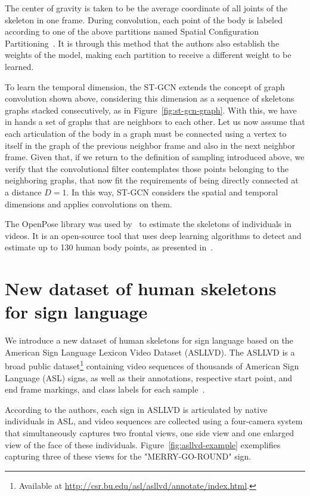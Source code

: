 The center of gravity is taken to be the average coordinate of all joints of the skeleton in one frame. During convolution, each point of the body is labeled according to one of the above partitions named Spatial Configuration Partitioning~\cite{st-gcn-2018}. It is through this method that the authors also establish the weights of the model, making each partition to receive a different weight to be learned.

To learn the temporal dimension, the ST-GCN extends the concept of graph convolution shown above, considering this dimension as a sequence of skeletons graphs stacked consecutively, as in Figure~\ref{fig:st-gcn-graph}. With this, we have in hands a set of graphs that are neighbors to each other. Let us now assume that each articulation of the body in a graph must be connected using a vertex to itself in the graph of the previous neighbor frame and also in the next neighbor frame. Given that, if we return to the definition of sampling introduced above, we verify that the convolutional filter contemplates those points belonging to the neighboring graphs, that now fit the requirements of being directly connected at a distance $D = 1$. In this way, ST-GCN considers the spatial and temporal dimensions and applies convolutions on them.

The OpenPose library was used by~\cite{st-gcn-2018} to estimate the skeletons of individuals in videos. It is an open-source tool that uses deep learning algorithms to detect and estimate up to 130 human body points, as presented in~\cite{cao-realtime-2017,simon-hand-2017,wei-cpm-2016}. 


\section{New dataset of human skeletons for sign language} 
\label{sec:new-dataset}

We introduce a new dataset of human skeletons for sign language based on the American Sign Language Lexicon Video Dataset (ASLLVD). The ASLLVD  is a broad public dataset\footnote{ Available at \url{http://csr.bu.edu/asl/asllvd/annotate/index.html}.} containing video sequences of thousands of American Sign Language (ASL) signs, as well as their annotations, respective start point, and end frame markings, and class labels for each sample~\cite{athitsos-asllvd-2008,neidle-2012}.

According to the authors, each sign in ASLLVD is articulated by native individuals in ASL, and video sequences are collected using a four-camera system that simultaneously captures two frontal views, one side view and one enlarged view of the face of these individuals. Figure~\ref{fig:asllvd-example} exemplifies capturing three of these views for the "MERRY-GO-ROUND" sign. 

